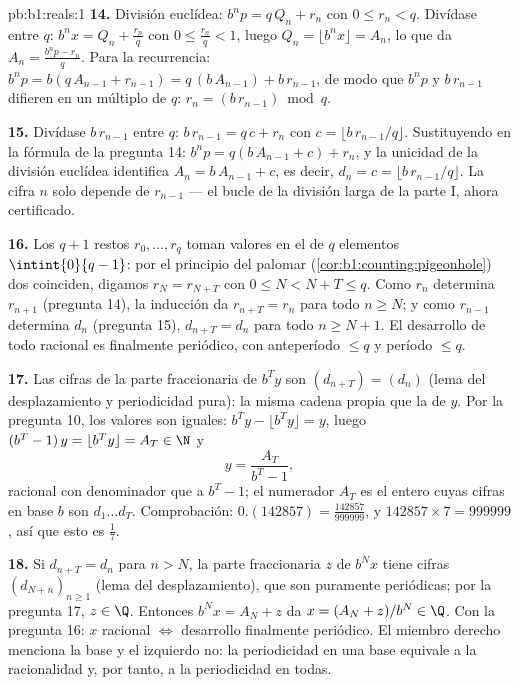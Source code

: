 \begin{solution}{pb:b1:reals:1}
\textbf{14.} División euclídea: $b^n p = q\,Q_n + r_n$ con
$0 \leq r_n < q$. Divídase entre $q$: $b^n x = Q_n + \frac{r_n}{q}$
con $0 \leq \frac{r_n}{q} < 1$, luego $Q_n = \lfloor b^n x \rfloor =
A_n$, lo que da $A_n = \frac{b^n p - r_n}{q}$. Para la recurrencia:
$b^n p = b(q\,A_{n-1} + r_{n-1}) = q\,(b\,A_{n-1}) + b\,r_{n-1}$, de
modo que $b^n p$ y $b\,r_{n-1}$ difieren en un múltiplo de $q$:
$r_n = (b\,r_{n-1}) \bmod q$.

\textbf{15.} Divídase $b\,r_{n-1}$ entre $q$: $b\,r_{n-1} = q\,c +
r_n$ con $c = \lfloor b\,r_{n-1}/q \rfloor$. Sustituyendo en la
fórmula de la pregunta 14: $b^n p = q(b\,A_{n-1} + c) + r_n$, y la
unicidad de la división euclídea identifica $A_n = b\,A_{n-1} + c$, es
decir, $d_n = c = \lfloor b\,r_{n-1}/q \rfloor$. La cifra $n$ solo
depende de $r_{n-1}$ --- el bucle de la división larga de la parte I,
ahora certificado.

\textbf{16.} Los $q + 1$ restos $r_0, \dots, r_q$ toman valores en el
 de $q$ elementos $\intint{0}{q-1}$: por el principio del
palomar (\cref{cor:b1:counting:pigeonhole}) dos coinciden, digamos
$r_N = r_{N+T}$ con $0 \leq N < N + T \leq q$. Como $r_n$ determina
$r_{n+1}$ (pregunta 14), la inducción da $r_{n+T} = r_n$ para todo
$n \geq N$; y como $r_{n-1}$ determina $d_n$ (pregunta 15),
$d_{n+T} = d_n$ para todo $n \geq N + 1$. El desarrollo de todo
racional es finalmente periódico, con anteperíodo $\leq q$ y período
$\leq q$.

\textbf{17.} Las cifras de la parte fraccionaria de $b^T y$ son
$(d_{n+T}) = (d_n)$ (lema del desplazamiento y periodicidad pura): la
misma cadena propia que la de $y$. Por la pregunta 10, los valores son
iguales: $b^T y - \lfloor b^T y \rfloor = y$, luego
$(b^T - 1)\,y = \lfloor b^T y \rfloor = A_T \in \N$ y
\[
y = \frac{A_T}{b^T - 1} ,
\]
racional con denominador que  a $b^T - 1$; el numerador $A_T$ es
el entero cuyas cifras en base $b$ son $d_1 \dots d_T$. Comprobación:
$0.(142857) = \frac{142857}{999999}$, y $142857 \times 7 = 999999$,
así que esto es $\frac 17$.

\textbf{18.} Si $d_{n+T} = d_n$ para $n > N$, la parte fraccionaria $z$
de $b^N x$ tiene cifras $(d_{N+n})_{n\geq1}$ (lema del
desplazamiento), que son puramente periódicas; por la pregunta 17,
$z \in \Q$. Entonces $b^N x = A_N + z$ da $x = (A_N + z)/b^N \in \Q$.
Con la pregunta 16: $x$ racional $\iff$ desarrollo finalmente
periódico. El miembro derecho menciona la base y el izquierdo no: la
periodicidad en una base equivale a la racionalidad y, por tanto, a la
periodicidad en todas.


\end{solution}
